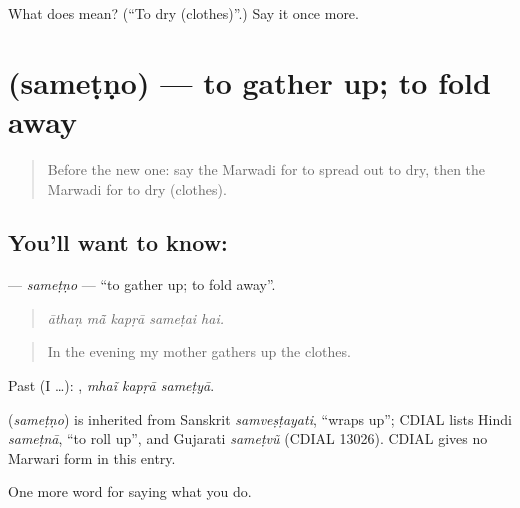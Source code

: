 \begin{tcolorbox}[breakable,colback=teal!4,colframe=teal!35!black,title={Before you move on}]
What does  mean? (\textquotedblleft{}To dry (clothes)\textquotedblright{}.) Say it once more.
\end{tcolorbox}
\section[\texorpdfstring{\mw{समेटणो} (sameṭṇo)}{समेटणो (sameṭṇo)}]{ (sameṭṇo) — to gather up; to fold away}

\label{lesson:MW-C170-sametno}



\begin{quote}
Before the new one: say the Marwadi for to spread out to dry, then the Marwadi for to dry (clothes).
\end{quote}

\subsection*{You'll want to know: }
\textbf{} — \emph{sameṭṇo} — \textquotedblleft{}to gather up; to fold away\textquotedblright{}.

\begin{quote}
    
\end{quote}

\begin{quote}
\emph{āthaṇ mā̃ kapṛā sameṭai hai.}
\end{quote}

\begin{quote}
In the evening my mother gathers up the clothes.
\end{quote}

Past (I …):   , \emph{mhaĩ kapṛā sameṭyā}.

\begin{cousinweb}
\textbf{} (\emph{sameṭṇo}) is inherited from Sanskrit \emph{samveṣṭayati}, \textquotedblleft{}wraps up\textquotedblright{}; CDIAL lists Hindi \emph{sameṭnā}, \textquotedblleft{}to roll up\textquotedblright{}, and Gujarati \emph{sameṭvũ} (CDIAL 13026). CDIAL gives no Marwari form in this entry.
\end{cousinweb}

\begin{grammarlens}[title={What you've built}]
One more word for saying what you do.
\end{grammarlens}

